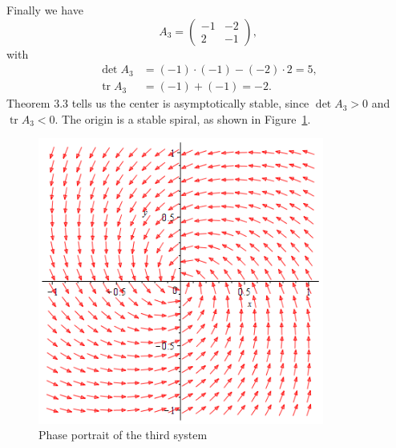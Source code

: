\documentclass{article}
\DeclareMathOperator{\tr}{tr}
\begin{document}
Finally we have
%
\begin{equation*}
    A_3 =
    \begin{pmatrix}
        -1 & -2 \\
        2 & -1
    \end{pmatrix}
    ,
\end{equation*}
%
with
%
\begin{align*}
    \det A_3 &= (-1) \cdot (-1) - (-2) \cdot 2 = 5, \\
    \tr A_3 &= (-1) + (-1) = -2
    .
\end{align*}
%
Theorem 3.3 tells us the center is asymptotically stable, since $\det A_3
> 0$ and $\tr A_3 < 0$. The origin is a stable spiral, as shown in
Figure~\ref{fig:397-c}.

\begin{figure}[!ht]
    \includegraphics[width=3.7in]{q397c}
    \centering
    \caption{Phase portrait of the third system}
    \label{fig:397-c}
\end{figure}
\end{document}
